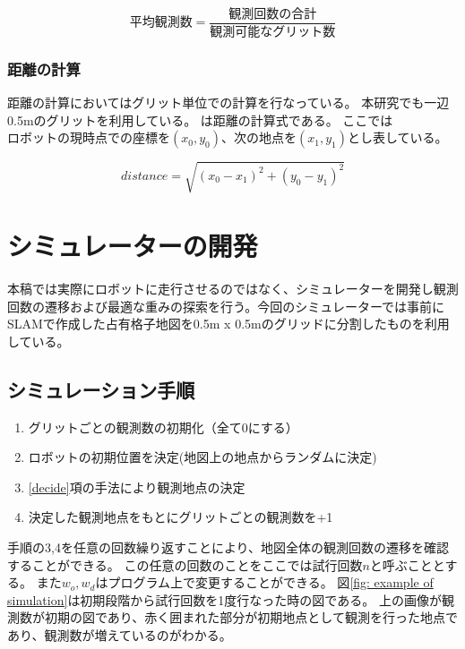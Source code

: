 \documentclass{jsarticle}
\begin{document}
\begin{equation}
  平均観測数 = \frac{観測回数の合計}{観測可能なグリット数}
	\label{eqn: observation}
\end{equation}

\subsubsection{距離の計算}
距離の計算においてはグリット単位での計算を行なっている。
本研究でも一辺0.5mのグリットを利用している。
は距離の計算式である。
ここでは$ロボットの現時点での座標を(x_0, y_0)、次の地点を(x_1,y_1)$とし表している。


\begin{equation}
  distance = \sqrt{(x_0-x_1)^2 + (y_0-y_1)^2}
	\label{eqn: distance}
\end{equation}



\section{シミュレーターの開発}
\label{simulation}
本稿では実際にロボットに走行させるのではなく、シミュレーターを開発し観測回数の遷移および最適な重みの探索を行う。今回のシミュレーターでは事前にSLAMで作成した占有格子地図を0.5m x 0.5mのグリッドに分割したものを利用している。

\subsection{シミュレーション手順}
\label{process-simulation}
\begin{enumerate}
  \item グリットごとの観測数の初期化（全て0にする）
  \item ロボットの初期位置を決定(地図上の地点からランダムに決定)
  \item \ref{decide}項の手法により観測地点の決定
  \item 決定した観測地点をもとにグリットごとの観測数を+1
\end{enumerate}
手順の3,4を任意の回数繰り返すことにより、地図全体の観測回数の遷移を確認することができる。
この任意の回数のことをここでは試行回数$n$と呼ぶこととする。
また$w_o,w_d$はプログラム上で変更することができる。
図\ref{fig: example of simulation}は初期段階から試行回数を1度行なった時の図である。
上の画像が観測数が初期の図であり、赤く囲まれた部分が初期地点として観測を行った地点であり、観測数が増えているのがわかる。
\end{document}
